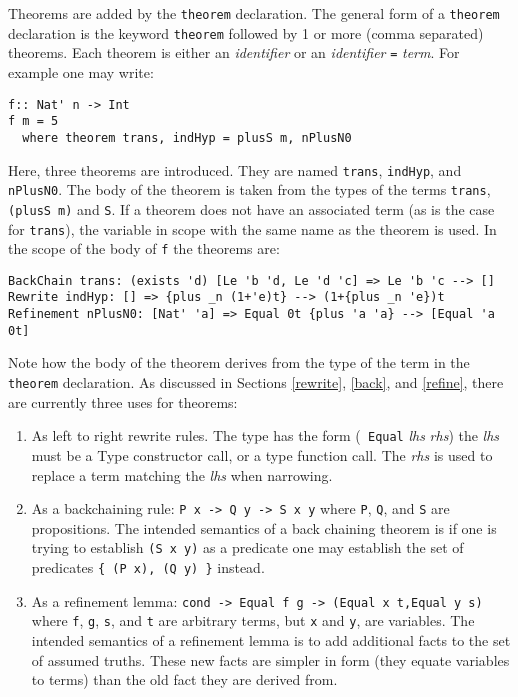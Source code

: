 \documentclass[11pt,twoside]{article}
\begin{document}
Theorems are added by the {\tt theorem} declaration. 
The general form of a {\tt theorem} declaration is the keyword
{\tt theorem} followed by 1 or more (comma separated) theorems.
Each theorem is either an {\it identifier} or an {\it identifier} \verb+=+ {\it term}.
For example one may write:
\begin{verbatim}
f:: Nat' n -> Int
f m = 5
  where theorem trans, indHyp = plusS m, nPlusN0
\end{verbatim}
Here, three theorems are introduced. They are named {\tt trans}, {\tt indHyp}, and
{\tt nPlusN0}. The body of the theorem is taken from the types
of the terms {\tt trans}, {\tt (plusS m)} and {\tt S}. If a theorem
does not have an associated term (as is the case for {\tt trans}), the
variable in scope with the same name as the theorem is used.
In the scope of the body of {\tt f} the theorems are:
\begin{verbatim}
BackChain trans: (exists 'd) [Le 'b 'd, Le 'd 'c] => Le 'b 'c --> []
Rewrite indHyp: [] => {plus _n (1+'e)t} --> (1+{plus _n 'e})t
Refinement nPlusN0: [Nat' 'a] => Equal 0t {plus 'a 'a} --> [Equal 'a 0t]
\end{verbatim}

Note how the body of the theorem derives from the type of the term in the {\tt
theorem} declaration. As discussed in Sections \ref{rewrite}, \ref{back}, 
and \ref{refine}, there are currently three uses for theorems:

\begin{enumerate} \item As left to right rewrite rules. The type has the form ({\tt
Equal} {\it lhs} {\it rhs}) the {\it lhs} must be a Type constructor call, or a type
function call. The {\it rhs} is used to replace a term matching the {\it lhs} when narrowing.

\item As a backchaining rule: \verb+P x -> Q y -> S x y+   where {\tt P}, {\tt Q}, 
and {\tt S} are propositions. The intended semantics of a back chaining theorem
is if one is trying to establish \verb+(S x y)+ as a predicate
one may establish the set of predicates \verb+{ (P x), (Q y) }+ instead.

\item As a refinement lemma:  \verb+cond -> Equal f g -> (Equal x t,Equal y s)+ where
{\tt f}, {\tt g}, {\tt s}, and {\tt t} are arbitrary terms, but {\tt x} and {\tt y},
are variables.  The intended semantics of a refinement lemma is to add
additional facts to the set of assumed truths. These new facts are
simpler in form (they equate variables to terms) than the old fact they are
derived from.

\end{enumerate}
\end{document}

